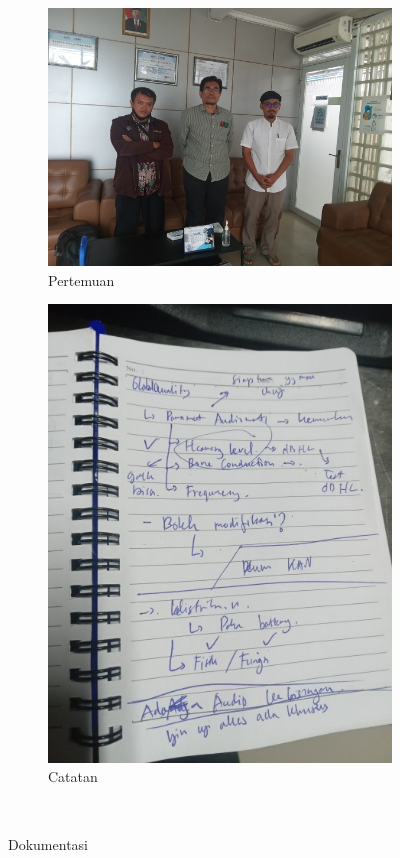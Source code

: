 \documentclass{article}
\begin{document}
\begin{figure}[!ht]
	\centering
	\begin{subfigure}[t]{0.45\textwidth}
		\includegraphics[width=\textwidth]{dokumentasi/rapat}
		\caption{Pertemuan}
	\end{subfigure}
	\begin{subfigure}[t]{0.45\textwidth}
		\includegraphics[width=\textwidth]{dokumentasi/catatan}
		\caption{Catatan}
	\end{subfigure}
	\\

	\caption{Dokumentasi}
\end{figure}
\end{document}
